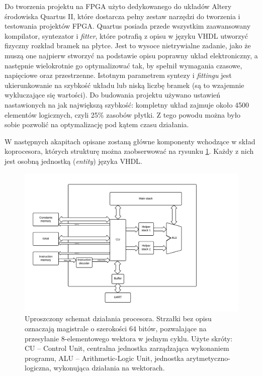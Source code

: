 Do tworzenia projektu na FPGA użyto dedykowanego do układów Altery środowiska Quartus II, które dostarcza pełny zestaw narzędzi do tworzenia i testowania projektów FPGA. Quartus posiada przede wszystkim zaawansowany kompilator, syntezator i \textit{fitter}, które potrafią z opisu w języku VHDL utworzyć fizyczny rozkład bramek na płytce. Jest to wysoce nietrywialne zadanie, jako że muszą one najpierw stworzyć na podstawie opisu poprawny układ elektroniczny, a następnie wielokrotnie go optymalizować tak, by spełnił wymagania czasowe, napięciowe oraz przestrzenne. Istotnym parametrem syntezy i \textit{fittingu} jest ukierunkowanie na szybkość układu lub niską liczbę bramek (są to wzajemnie wykluczające się wartości). Do budowania projektu używano ustawień nastawionych na jak największą szybkość: kompletny układ zajmuje około 4500 elementów logicznych, czyli 25\% zasobów płytki. Z tego powodu można było sobie pozwolić na optymalizację pod kątem czasu działania.

W następnych akapitach opisane zostaną główne komponenty wchodzące w skład koprocesora, których strukturę można zaobserwować na rysunku \ref{fig:processor-scheme}. Każdy z nich jest osobną jednostką (\textit{entity}) języka VHDL.

\begin{figure}
  \begin{center}
    \includegraphics[scale=0.5]{images/Processor-scheme.png}
    \caption{Uproszczony schemat działania procesora. Strzałki bez opisu oznaczają magistrale o szerokości 64 bitów, pozwalające na przesyłanie 8-elementowego wektora w jednym cyklu. Użyte skróty: CU -- Control Unit, centralna jednostka zarządzająca wykonaniem programu, ALU -- Arithmetic-Logic Unit, jednostka arytmetyczno-logiczna, wykonująca działania na wektorach. }
    \label{fig:processor-scheme}
  \end{center}
\end{figure}



